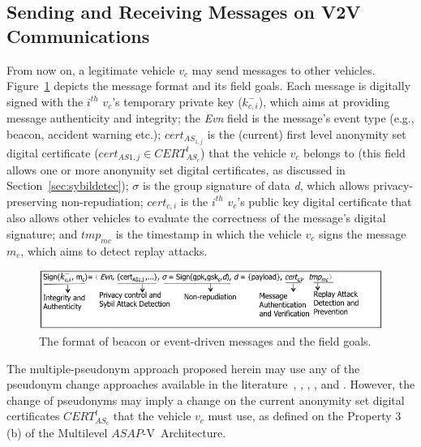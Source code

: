 \documentclass[preprint,12pt]{elsarticle}
\newcommand{\protocolname}{$ASAP$-V}
\begin{document}
\subsection{Sending and Receiving Messages on V2V Communications}
\label{sec:sendingandreceiving}

From now on, a legitimate vehicle $v_{c}$ may send messages to other vehicles. Figure~\ref{fig:msg-format} depicts the message format and its field goals. Each message is digitally signed with the $i^{th}$ $v_{c}$'s temporary private key ($k^{-}_{c,i}$), which aims at providing message authenticity and integrity; the \textit{Evn} field is the message's event type (e.g., beacon, accident warning etc.); $cert_{AS_{1,j}}$ is the (current) first level anonymity set digital certificate ($cert_{AS{1,j}} \in CERT^{t}_{AS_{c}}$) that the vehicle $v_{c}$ belongs to (this field allows one or more anonymity set digital certificates, as discussed in Section~\ref{sec:sybildetec}); $\sigma$ is the group signature of data \textit{d}, which allows privacy-preserving non-repudiation; $cert_{c, i}$ is the $i^{th}$ $v_{c}$'s public key digital certificate that also allows other vehicles to evaluate the correctness of the message's digital signature; and $tmp_{mc}$ is the timestamp in which the vehicle $v_{c}$ signs the message $m_c$, which aims to detect replay attacks.

\begin{figure}[ht]
\centering
\includegraphics[scale=.43]{figures/message-format.jpg}
\caption{The format of beacon or event-driven messages and the field goals.}
\label{fig:msg-format}
\end{figure}

The multiple-pseudonym approach proposed herein may use any of the pseudonym change approaches available in the literature~\cite{lu2012pseudonym}, \cite{mix-zone-vanets}, \cite{buttyan2007effectiveness}, \cite{caravan}, \cite{buttyan2009slow} and \cite{mix-zone-motion}. However, the change of pseudonyms may imply a change on the current anonymity set digital certificates $CERT^{t}_{AS_{c}}$ that the vehicle $v_{c}$ must use, as defined on the Property 3 (b) of the Multilevel \protocolname~Architecture.
\end{document}
